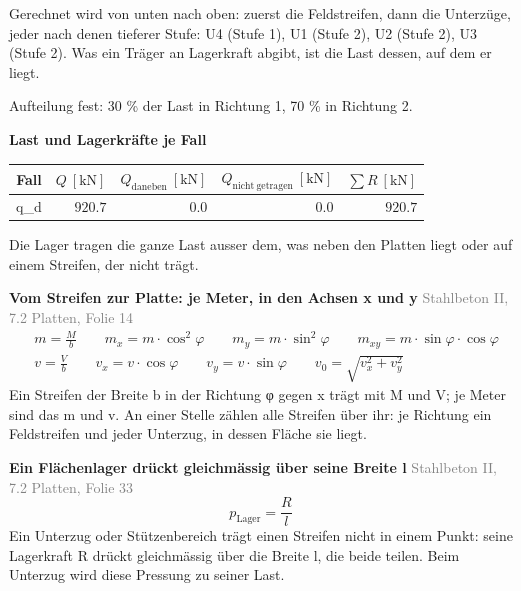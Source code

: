 \documentclass[11pt,a4paper]{article}
\newcommand{\normref}[1]{{\small\textcolor{gray}{#1}}}
\begin{document}
Gerechnet wird von unten nach oben: zuerst die Feldstreifen, dann die Unterzüge, jeder nach denen tieferer Stufe: U4 (Stufe 1), U1 (Stufe 2), U2 (Stufe 2), U3 (Stufe 2). Was ein Träger an Lagerkraft abgibt, ist die Last dessen, auf dem er liegt.

Aufteilung fest: 30 \% der Last in Richtung 1, 70 \% in Richtung 2.

\noindent\textbf{Last und Lagerkräfte je Fall}
\begin{longtable}{rrrrr}
\hline
Fall & $Q\ [\mathrm{kN}]$ & $Q_{\mathrm{daneben}}\ [\mathrm{kN}]$ & $Q_{\mathrm{nicht\ getragen}}\ [\mathrm{kN}]$ & $\sum R\ [\mathrm{kN}]$ \\
\hline
\endhead
q\_d & $920.7$ & $0.0$ & $0.0$ & $920.7$ \\
\hline
\end{longtable}
Die Lager tragen die ganze Last ausser dem, was neben den Platten liegt oder auf einem Streifen, der nicht trägt.

\noindent\textbf{Vom Streifen zur Platte: je Meter, in den Achsen x und y} \hfill \normref{Stahlbeton II, 7.2 Platten, Folie 14}
\begin{equation*}
\begin{aligned} & m = \frac{M}{b} \qquad m_x = m \cdot \cos^2\varphi \qquad m_y = m \cdot \sin^2\varphi \qquad m_{xy} = m \cdot \sin\varphi \cdot \cos\varphi \\ & v = \frac{V}{b} \qquad v_x = v \cdot \cos\varphi \qquad v_y = v \cdot \sin\varphi \qquad v_0 = \sqrt{v_x^2 + v_y^2} \end{aligned}
\end{equation*}
Ein Streifen der Breite b in der Richtung φ gegen x trägt mit M und V; je Meter sind das m und v. An einer Stelle zählen alle Streifen über ihr: je Richtung ein Feldstreifen und jeder Unterzug, in dessen Fläche sie liegt.

\noindent\textbf{Ein Flächenlager drückt gleichmässig über seine Breite l} \hfill \normref{Stahlbeton II, 7.2 Platten, Folie 33}
\begin{equation*}
p_{\mathrm{Lager}} = \frac{R}{l}
\end{equation*}
Ein Unterzug oder Stützenbereich trägt einen Streifen nicht in einem Punkt: seine Lagerkraft R drückt gleichmässig über die Breite l, die beide teilen. Beim Unterzug wird diese Pressung zu seiner Last.
\end{document}
